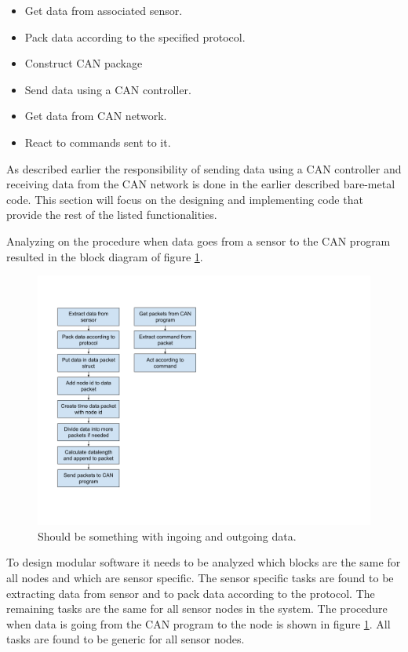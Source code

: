 \begin{itemize}
\item Get data from associated sensor.
\item Pack data according to the specified protocol.
\item Construct CAN package
\item Send data using a CAN controller.
\item Get data from CAN network.
\item React to commands sent to it.
\end{itemize}

As described earlier the responsibility of sending data using a CAN controller and receiving data from the CAN network is done in the earlier described bare-metal code.
This section will focus on the designing and implementing code that provide the rest of the listed functionalities.

Analyzing on the procedure when data goes from a sensor to the CAN program resulted in the block diagram of figure \ref{fig:block_gps}.

\begin{figure}[!h]
\centering
\includegraphics[width=1\textwidth]{graphics/block_diagram.png}
\caption{Should be something with ingoing and outgoing data.}
\label{fig:block_gps}
\end{figure}

To design modular software it needs to be analyzed which blocks are the same for all nodes and which are sensor specific.
The sensor specific tasks are found to be extracting data from sensor and to pack data according to the protocol.
The remaining tasks are the same for all sensor nodes in the system. 
The procedure when data is going from the CAN program to the node is shown in figure \ref{fig:block_gps}.
All tasks are found to be generic for all sensor nodes.

